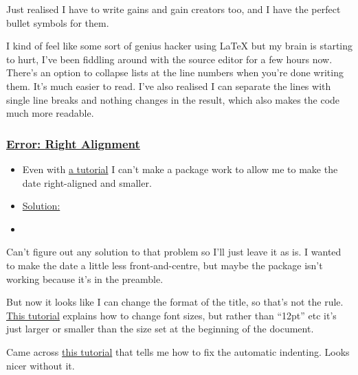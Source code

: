 \documentclass[12pt]{article}
\begin{document}
Just realised I have to write gains and gain creators too, and I have the perfect bullet symbols for them. 

I kind of feel like some sort of genius hacker using LaTeX but my brain is starting to hurt, I’ve been fiddling around with the source editor for a few hours now.
There’s an option to collapse lists at the line numbers when you’re done writing them. It’s much easier to read. I’ve also realised I can separate the lines with single line breaks and nothing changes in the result, which also makes the code much more readable.

\subsubsection{\underline{Error: Right Alignment}}\label{error:er4}
\begin{itemize}
    \item Even with \href{https://www.overleaf.com/learn/latex/Text_alignment#Right-justified_text}{a tutorial} I can’t make a package work to allow me to make the date right-aligned and smaller.
\end{itemize}
\begin{itemize}
\renewcommand{\labelitemi}{$\nobullet$}
\item \underline{Solution:}
\renewcommand{\labelitemi}{$\bullet$}
    \item 
\end{itemize}
    
Can’t figure out any solution to that problem so I’ll just leave it as is. I wanted to make the date a little less front-and-centre, but maybe the package isn’t working because it’s in the preamble.

But now it looks like I can change the format of the title, so that’s not the rule. \href{https://www.overleaf.com/learn/latex/Font_sizes,_families,_and_styles}{This tutorial} explains how to change font sizes, but rather than “12pt” etc it’s just larger or smaller than the size set at the beginning of the document.

Came across \href{https://www.overleaf.com/learn/latex/Paragraph_formatting#Reference_guide}{this tutorial} that tells me how to fix the automatic indenting. Looks nicer without it.
\end{document}
